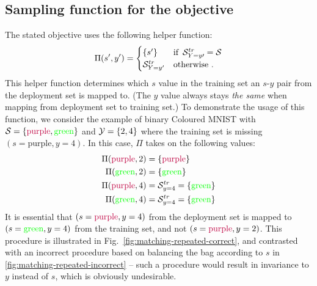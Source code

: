 \subsection{Sampling function for the objective}%
\label{sub:sampling_function_for_objective}
The stated objective uses the following helper function:
\begin{align}
\Pi(s',y') = \begin{cases}
  \{s'\}&\text{if }\,{\mathcal{S}}^{tr}_{Y=y\prime}={\mathcal{S}}\\
  {\mathcal{S}}^{tr}_{Y=y'}&\text{otherwise}~.
\end{cases}
\end{align}
This helper function determines which $s$ value in the training set an $s$-$y$ pair from the
deployment set is mapped to. (The $y$ value always stays \emph{the same} when mapping from
deployment set to training set.) To demonstrate the usage of this function, we consider the example
of binary Coloured MNIST with \({\mathcal{S}}=\{\text{\color{purple}{purple}}, \text{\color{green}green}\}\)
and \({\mathcal{Y}}=\{2, 4\}\) where the training set is missing \((s=\text{purple}, y=4)\). In this case,
$\Pi$ takes on the following values:
\begin{align}
  \Pi(\text{{\color{purple}purple}}, 2) &= \{\text{\color{purple}purple}\}\\
  \Pi(\text{\color{green}green},  2) &= \{\text{\color{green}green} \}\\
  \Pi(\text{\color{purple}purple}, 4) &={\mathcal{S}}^{tr}_{y=4} = \{\text{\color{green}green} \}\\
  \Pi(\text{\color{green}green},  4) &={\mathcal{S}}^{tr}_{y=4} = \{\text{\color{green}green} \}
\end{align}
It is essential that \((s=\text{\color{purple}{purple}}, y=4)\) from the deployment set is mapped
to \((s=\text{\color{green}{green}}, y=4)\) from the training set, and not
\((s=\text{\color{purple}{purple}}, y=2)\).
This procedure is illustrated in Fig.~\ref{fig:matching-repeated-correct}, and contrasted with an
incorrect procedure based on balancing the bag according to $s$ in
\ref{fig:matching-repeated-incorrect} -- such a procedure would result in invariance to $y$ instead
of $s$, which is obviously undesirable.


